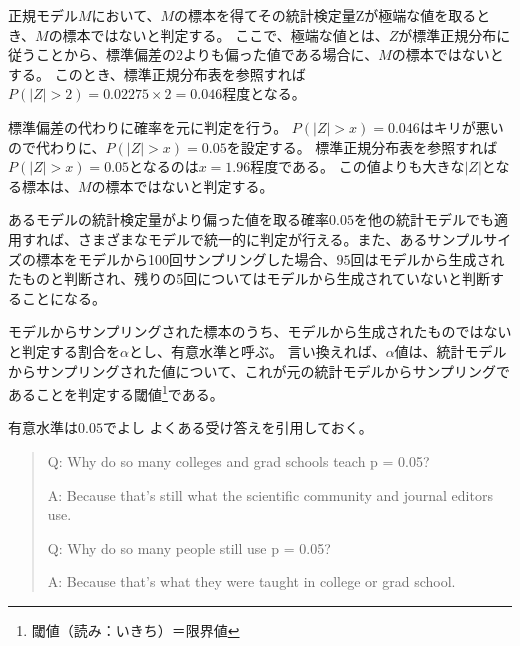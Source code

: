 正規モデル$M$において、$M$の標本を得てその統計検定量Zが極端な値を取るとき、$M$の標本ではないと判定する。
ここで、極端な値とは、$Z$が標準正規分布に従うことから、標準偏差の2よりも偏った値である場合に、$M$の標本ではないとする。
このとき、標準正規分布表を参照すれば$P(|Z|>2)=0.02275\times 2=0.046$程度となる。

標準偏差の代わりに確率を元に判定を行う。
$P(|Z|>x)=0.046$はキリが悪いので代わりに、$P(|Z|>x)=0.05$を設定する。
標準正規分布表を参照すれば$P(|Z|>x)=0.05$となるのは$x=1.96$程度である。
この値よりも大きな$|Z|$となる標本は、$M$の標本ではないと判定する。

あるモデルの統計検定量がより偏った値を取る確率$0.05$を他の統計モデルでも適用すれば、さまざまなモデルで統一的に判定が行える。また、あるサンプルサイズの標本をモデルから100回サンプリングした場合、$95$回はモデルから生成されたものと判断され、残りの5回についてはモデルから生成されていないと判断することになる。


\begin{defi}
    モデルからサンプリングされた標本のうち、モデルから生成されたものではないと判定する割合を$\alpha$とし、有意水準と呼ぶ。
    言い換えれば、$\alpha$値は、統計モデルからサンプリングされた値について、これが元の統計モデルからサンプリングであることを判定する閾値\footnote{閾値（読み：いきち）＝限界値}である。
\end{defi}



\begin{SMbox}{有意水準は$0.05$でよし}
    よくある受け答えを引用しておく\cite{greenland2016statistical}。
    \begin{quote}
        Q: Why do so many colleges and grad schools teach p = 0.05?

        A: Because that's still what the scientific community and journal editors use.

        Q: Why do so many people still use p = 0.05?

        A: Because that's what they were taught in college or grad school.
    \end{quote}
\end{SMbox}


